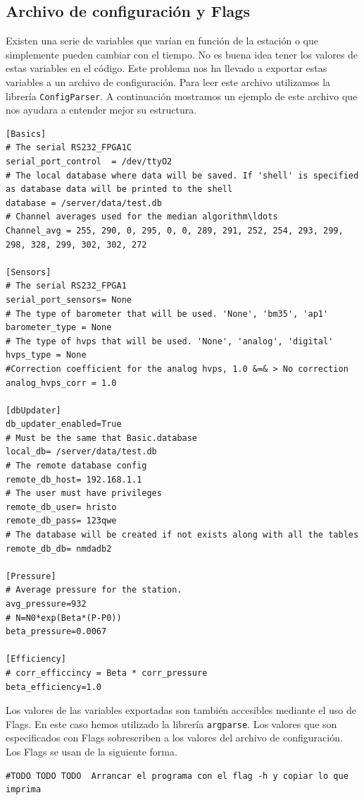 	\subsection{Archivo de configuración y Flags}
		Existen una serie de variables que varían en función de la estación o que simplemente pueden cambiar con el tiempo. No es buena idea
		tener los valores de estas variables en el código. Este problema nos ha llevado a exportar estas variables a un archivo de configuración.
		Para leer este archivo utilizamos la librería \texttt{ConfigParser}\cite{py_ConfigParser}. A continuación mostramos un ejemplo de este
		archivo que nos ayudara a entender mejor su estructura.
		\begin{lstlisting}
[Basics]
# The serial RS232_FPGA1C
serial_port_control  = /dev/ttyO2
# The local database where data will be saved. If 'shell' is specified as database data will be printed to the shell
database = /server/data/test.db
# Channel averages used for the median algorithm\ldots
Channel_avg = 255, 290, 0, 295, 0, 0, 289, 291, 252, 254, 293, 299, 298, 328, 299, 302, 302, 272

[Sensors]
# The serial RS232_FPGA1
serial_port_sensors= None
# The type of barometer that will be used. 'None', 'bm35', 'ap1'
barometer_type = None
# The type of hvps that will be used. 'None', 'analog', 'digital'
hvps_type = None
#Correction coefficient for the analog hvps, 1.0 &=& > No correction
analog_hvps_corr = 1.0

[dbUpdater]
db_updater_enabled=True
# Must be the same that Basic.database
local_db= /server/data/test.db 
# The remote database config
remote_db_host= 192.168.1.1
# The user must have privileges
remote_db_user= hristo
remote_db_pass= 123qwe
# The database will be created if not exists along with all the tables
remote_db_db= nmdadb2

[Pressure]
# Average pressure for the station.
avg_pressure=932
# N=N0*exp(Beta*(P-P0))
beta_pressure=0.0067

[Efficiency]
# corr_efficcincy = Beta * corr_pressure
beta_efficiency=1.0
\end{lstlisting}
		Los valores de las variables exportadas son también accesibles mediante el uso de Flags. En este caso hemos utilizado la librería 
		\texttt{argparse}\cite{py_argparse}. Los valores que son especificados con Flags sobrescriben a los valores del archivo de
		configuración. Los Flags se usan de la siguiente forma.
		\begin{lstlisting}
#TODO TODO TODO  Arrancar el programa con el flag -h y copiar lo que imprima 
		\end{lstlisting}
